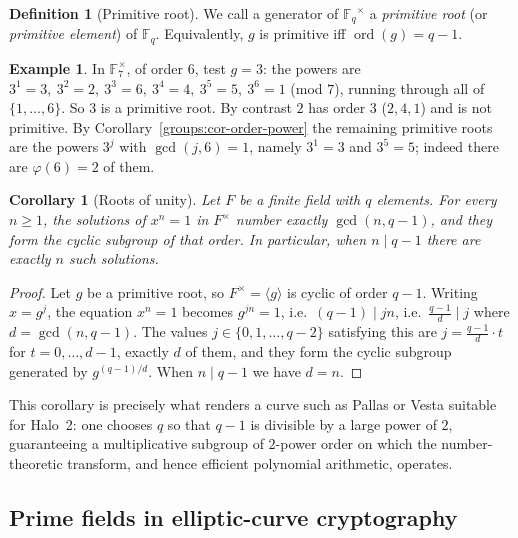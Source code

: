 \documentclass[11pt,a4paper]{article}
\newtheorem{corollary}[theorem]{Corollary}
\theoremstyle{definition}
\newtheorem{definition}[theorem]{Definition}
\newtheorem{example}[theorem]{Example}
\theoremstyle{remark}
\newcommand{\F}{\ensuremath{\mathbb{F}}}
\newcommand{\Fq}{\ensuremath{\mathbb{F}_{q}}}
\DeclareMathOperator{\ord}{ord}
\begin{document}
\begin{definition}[Primitive root]
\label{finitefields:def:primitive}
We call a generator of \(\Fq^\times\) a \emph{primitive root} (or \emph{primitive element}) of \(\Fq\). Equivalently, \(g\) is primitive iff \(\ord(g) = q-1\).
\end{definition}

\begin{example}
\label{finitefields:ex:primitiveroot}
In \(\F_7^\times\), of order \(6\), test \(g = 3\): the powers are \(3^1 = 3,\ 3^2 = 2,\ 3^3 = 6,\ 3^4 = 4,\ 3^5 = 5,\ 3^6 = 1\) (mod \(7\)), running through all of \(\{1,\dots,6\}\). So \(3\) is a primitive root. By contrast \(2\) has order \(3\) (\(2,4,1\)) and is not primitive. By Corollary~\ref{groups:cor-order-power} the remaining primitive roots are the powers \(3^j\) with \(\gcd(j,6)=1\), namely \(3^1 = 3\) and \(3^5 = 5\); indeed there are \(\varphi(6) = 2\) of them.
\end{example}

\begin{corollary}[Roots of unity]
\label{finitefields:cor:rootsofunity}
Let \(F\) be a finite field with \(q\) elements. For every \(n \ge 1\), the solutions of \(x^n = 1\) in \(F^\times\) number exactly \(\gcd(n, q-1)\), and they form the cyclic subgroup of that order. In particular, when \(n \mid q-1\) there are exactly \(n\) such solutions.
\end{corollary}

\begin{proof}
Let \(g\) be a primitive root, so \(F^\times = \langle g\rangle\) is cyclic of order \(q-1\). Writing \(x = g^j\), the equation \(x^n = 1\) becomes \(g^{jn} = 1\), i.e.\ \((q-1) \mid jn\), i.e.\ \(\frac{q-1}{d} \mid j\) where \(d = \gcd(n, q-1)\). The values \(j \in \{0, 1, \dots, q-2\}\) satisfying this are \(j = \frac{q-1}{d}\cdot t\) for \(t = 0, \dots, d-1\), exactly \(d\) of them, and they form the cyclic subgroup generated by \(g^{(q-1)/d}\). When \(n \mid q-1\) we have \(d = n\).
\end{proof}

This corollary is precisely what renders a curve such as Pallas or Vesta suitable for Halo~2: one chooses \(q\) so that \(q - 1\) is divisible by a large power of \(2\), guaranteeing a multiplicative subgroup of \(2\)-power order on which the number-theoretic transform, and hence efficient polynomial arithmetic, operates.

\subsection{Prime fields in elliptic-curve cryptography}
\label{finitefields:subsec:ecc}
\end{document}
